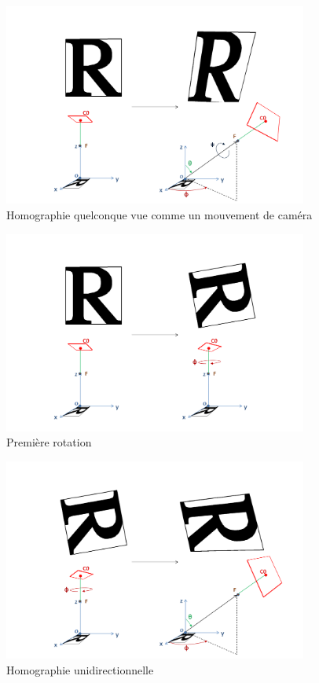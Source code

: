 \documentclass[c,12pt]{beamer}
\begin{document}
  \begin{frame}
  \begin{figure}
   \centering
   \includegraphics[width=100mm]{beamer_decompo_all.png}
   \caption{Homographie quelconque vue comme un mouvement de caméra}
  \end{figure}
  \end{frame}

  \begin{frame}
  \begin{figure}
   \centering
   \includegraphics[width=100mm]{beamer_decompo1_rotation_phi.png}
   \caption{Première rotation}
  \end{figure}
  \end{frame}

  \begin{frame}
  \begin{figure}
   \centering
   \includegraphics[width=100mm]{beamer_decompo2_homo_part.png}
   \caption{Homographie unidirectionnelle}
  \end{figure}
  \end{frame}
\end{document}
